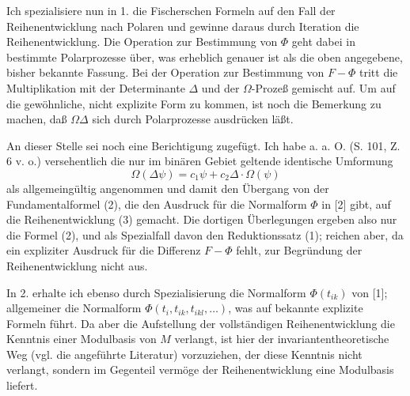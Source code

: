 \documentclass[11pt]{article}
\begin{document}
Ich spezialisiere nun in 1. die Fischerschen Formeln auf den Fall der Reihenentwicklung nach Polaren und gewinne daraus durch Iteration die Reihenentwicklung. Die Operation zur Bestimmung von $\Phi$ geht dabei in bestimmte Polarprozesse über, was erheblich genauer ist als die oben angegebene, bisher bekannte Fassung. Bei der Operation zur Bestimmung von $F-\Phi$ tritt die Multiplikation mit der Determinante $\Delta$ und der $\Omega$-Prozeß gemischt auf. Um auf die gewöhnliche, nicht explizite Form zu kommen, ist noch die Bemerkung zu machen, daß $\Omega\Delta$ sich durch Polarprozesse ausdrücken läßt.

An dieser Stelle sei noch eine Berichtigung zugefügt. Ich habe a. a. O. (S. 101, Z. 6 v. o.) versehentlich die nur im binären Gebiet geltende identische Umformung
\[
        \Omega(\Delta\psi)=c_1\psi+c_2\Delta\cdot\Omega(\psi)
\]
als allgemeingültig angenommen und damit den Übergang von der Fundamentalformel (2), die den Ausdruck für die Normalform $\Phi$ in [2] gibt, auf die Reihenentwicklung (3) gemacht. Die dortigen Überlegungen ergeben also nur die Formel (2), und als Spezialfall davon den Reduktionssatz (1); reichen aber, da ein expliziter Ausdruck für die Differenz $F-\Phi$ fehlt, zur Begründung der Reihenentwicklung nicht aus.

In 2. erhalte ich ebenso durch Spezialisierung die Normalform $\Phi(t_{ik})$ von [1]; allgemeiner die Normalform $\Phi(t_i,t_{ik},t_{ikl},\ldots)$, was auf bekannte explizite Formeln führt. Da aber die Aufstellung der vollständigen Reihenentwicklung die Kenntnis einer Modulbasis von $M$ verlangt, ist hier der invariantentheoretische Weg (vgl. die angeführte Literatur) vorzuziehen, der diese Kenntnis nicht verlangt, sondern im Gegenteil vermöge der Reihenentwicklung eine Modulbasis liefert.
\end{document}
